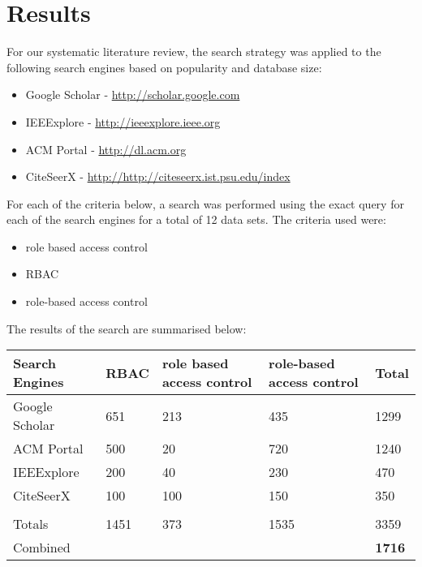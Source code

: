 \section{Results} \label{sec:results}

For our systematic literature review, the search strategy was applied to the following search engines based on popularity and database size:

\begin{itemize}
\item Google Scholar - \url{http://scholar.google.com}
\item IEEExplore - \url{http://ieeexplore.ieee.org}
\item ACM Portal - \url{http://dl.acm.org}
\item CiteSeerX - \url{http://http://citeseerx.ist.psu.edu/index}
\end{itemize}

For each of the criteria below, a search was performed using the exact query for each of the search engines for a total of 12 data sets.  The criteria used were:

\begin{itemize}
\item role based access control
\item RBAC
\item role-based access control
\end{itemize}

The results of the search are summarised below:

\begin{center}
\begin{tabular}{|p{3.5cm}|p{1.25cm}|p{4.25cm}|p{4.25cm}|p{1cm}|}

\hline
\textbf{Search Engines} & 
\textbf{RBAC} & 
\textbf{role based access control} & 
\textbf{role-based access control} & 
\textbf{Total}
\\\hline

Google Scholar & 651 & 213 & 435 & 1299 \\\hline
ACM Portal & 500 & 20 & 720 & 1240 \\\hline
IEEExplore & 200 & 40 & 230 & 470 \\\hline
CiteSeerX & 100 & 100 & 150 & 350 \\\hline
 &  &  &  & \\\hline
Totals & 1451 & 373 & 1535 & 3359 \\\hline
Combined &  &  &  & \textbf{1716} \\\hline

\end{tabular}
\end{center}

